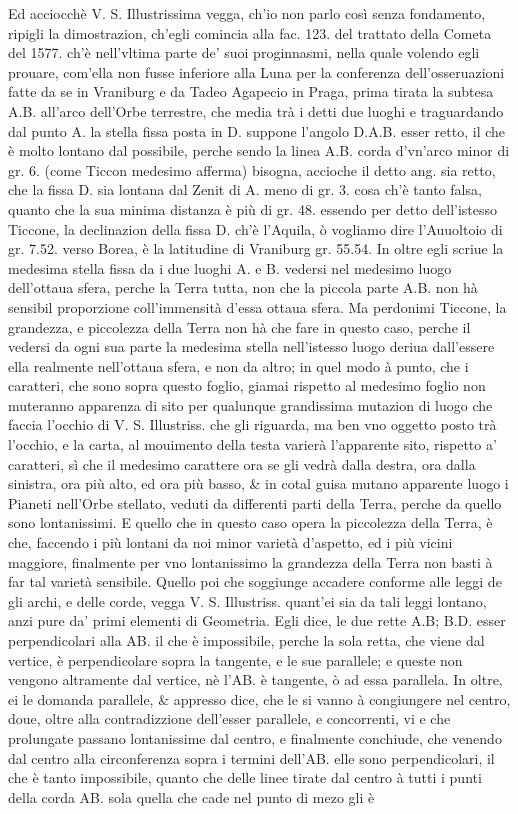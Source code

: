 \documentclass[11pt,twoside,openany]{book}
\begin{document}
Ed acciocchè V. S. Illustrissima vegga, ch'io non parlo così senza fondamento, ripigli la dimostrazion, ch'egli comincia alla fac. 123. del trattato della Cometa del 1577. ch'è nell'vltima parte de' suoi proginnasmi, nella quale volendo egli prouare, com'ella non fusse inferiore alla Luna per la conferenza dell'osseruazioni fatte da se in Vraniburg e da Tadeo Agapecio in Praga, prima tirata la subtesa A.B. all'arco dell'Orbe terrestre, che media trà i detti due luoghi e traguardando dal punto A. la stella fissa posta in D. suppone l'angolo D.A.B. esser retto, il che è molto lontano dal possibile, perche sendo la linea A.B. corda d'vn'arco minor di gr. 6. (come Ticcon medesimo afferma) bisogna, accioche il detto ang. sia retto, che la fissa D. sia lontana dal Zenit di A. meno di gr. 3. cosa ch'è tanto falsa, quanto che la sua minima distanza è più di gr. 48. essendo per detto dell'istesso Ticcone, la declinazion della fissa D. ch'è l'Aquila, ò vogliamo dire l'Auuoltoio di gr. 7.52. verso Borea, è la latitudine di Vraniburg gr. 55.54. In oltre egli scriue la medesima stella fissa da i due luoghi A. e B. vedersi nel medesimo luogo dell'ottaua sfera, perche la Terra tutta, non che la piccola parte A.B. non hà sensibil proporzione coll'immensità d'essa ottaua sfera. Ma perdonimi Ticcone, la grandezza, e piccolezza della Terra non hà che fare in questo caso, perche il vedersi da ogni sua parte la medesima stella nell'istesso luogo deriua dall'essere ella realmente nell'ottaua sfera, e non da altro; in quel modo à punto, che i caratteri, che sono sopra questo foglio, giamai rispetto al medesimo foglio non muteranno apparenza di sito per qualunque grandissima mutazion di luogo che faccia l'occhio di V. S. Illustriss. che gli riguarda, ma ben vno oggetto posto trà l'occhio, e la carta, al mouimento della testa varierà l'apparente sito, rispetto a' caratteri, sì che il medesimo carattere ora se gli vedrà dalla destra, ora dalla sinistra, ora più alto, ed ora più basso, \& in cotal guisa mutano apparente luogo i Pianeti nell'Orbe stellato, veduti da differenti parti della Terra, perche da quello sono lontanissimi. E quello che in questo caso opera la piccolezza della Terra, è che, faccendo i più lontani da noi minor varietà d'aspetto, ed i più vicini maggiore, finalmente per vno lontanissimo la grandezza della Terra non basti à far tal varietà sensibile. Quello poi che soggiunge accadere conforme alle leggi de gli archi, e delle corde, vegga V. S. Illustriss. quant'ei sia da tali leggi lontano, anzi pure da' primi elementi di Geometria. Egli dice, le due rette A.B; B.D. esser perpendicolari alla AB. il che è impossibile, perche la sola retta, che viene dal vertice, è perpendicolare sopra la tangente, e le sue parallele; e queste non vengono altramente dal vertice, nè l'AB. è tangente, ò ad essa parallela. In oltre, ei le domanda parallele, \& appresso dice, che le si vanno à congiungere nel centro, doue, oltre alla contradizzione dell'esser parallele, e concorrenti, vi e che prolungate passano lontanissime dal centro, e finalmente conchiude, che venendo dal centro alla circonferenza sopra i termini dell'AB. elle sono perpendicolari, il che è tanto impossibile, quanto che delle linee tirate dal centro à tutti i punti della corda AB. sola quella che cade nel punto di mezo gli è 
\end{document}
